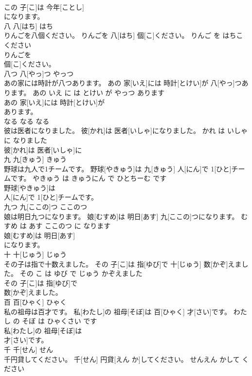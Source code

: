 \documentclass[8pt]{extreport}
\begin{document}
\begin{CJK}{UTF8}{min}
\\	この 子[こ]は 今年[ことし]
\\	になります。		
\\	八	八[はち]	はち	
\\	りんごを八個ください。	りんごを 八[はち] 個[こ]ください。	りんご を はちこ ください	
\\	りんごを
\\	個[こ]ください。		
\\	八つ	八[やっ]つ	やっつ	
\\	あの家には時計が八つあります。	あの 家[いえ]には 時計[とけい]が 八[やっ]つあります。	あの いえ に は とけい が やっつ あります	
\\	あの 家[いえ]には 時計[とけい]が
\\	あります。		
\\	なる	なる	なる	
\\	彼は医者になりました。	彼[かれ]は 医者[いしゃ]になりました。	かれ は いしゃ に なりました	
\\	彼[かれ]は 医者[いしゃ]に
\\	九	九[きゅう]	きゅう	
\\	野球は九人で1チームです。	野球[やきゅう]は 九[きゅう] 人[にん]で 1[ひと]チームです。	やきゅう は きゅうにん で ひとちーむ です	
\\	野球[やきゅう]は
\\	人[にん]で 1[ひと]チームです。		
\\	九つ	九[ここの]つ	ここのつ	
\\	娘は明日九つになります。	娘[むすめ]は 明日[あす] 九[ここの]つになります。	むすめ は あす ここのつ に なります	
\\	娘[むすめ]は 明日[あす]
\\	になります。		
\\	十	十[じゅう]	じゅう	
\\	その子は指で十数えました。	その 子[こ]は 指[ゆび]で 十[じゅう] 数[かぞ]えました。	その こ は ゆび で じゅう かぞえました	
\\	その 子[こ]は 指[ゆび]で
\\	数[かぞ]えました。		
\\	百	百[ひゃく]	ひゃく	
\\	私の祖母は百才です。	私[わたし]の 祖母[そぼ]は 百[ひゃく] 才[さい]です。	わたし の そぼ は ひゃくさい です	
\\	私[わたし]の 祖母[そぼ]は
\\	才[さい]です。		
\\	千	千[せん]	せん	
\\	千円貸してください。	千[せん] 円貸[えん か]してください。	せんえん かして ください	

\end{CJK}
\end{document}
